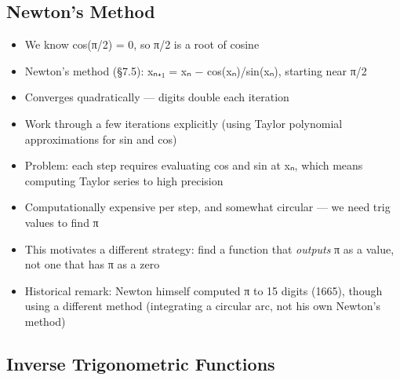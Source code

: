 \documentclass[
  10pt,
  letterpaper,
]{scrbook}
\providecommand{\tightlist}{%
  \setlength{\itemsep}{0pt}\setlength{\parskip}{0pt}}
\begin{document}
\subsection{Newton's Method}\label{newtons-method-1}

\begin{itemize}
\tightlist
\item
  We know cos(π/2) = 0, so π/2 is a root of cosine
\item
  Newton's method (§7.5): xₙ₊₁ = xₙ − cos(xₙ)/sin(xₙ), starting near π/2
\item
  Converges quadratically --- digits double each iteration
\item
  Work through a few iterations explicitly (using Taylor polynomial
  approximations for sin and cos)
\item
  Problem: each step requires evaluating cos and sin at xₙ, which means
  computing Taylor series to high precision
\item
  Computationally expensive per step, and somewhat circular --- we need
  trig values to find π
\item
  This motivates a different strategy: find a function that
  \emph{outputs} π as a value, not one that has π as a zero
\item
  Historical remark: Newton himself computed π to 15 digits (1665),
  though using a different method (integrating a circular arc, not his
  own Newton's method)
\end{itemize}

\subsection{Inverse Trigonometric
Functions}\label{inverse-trigonometric-functions}
\end{document}
